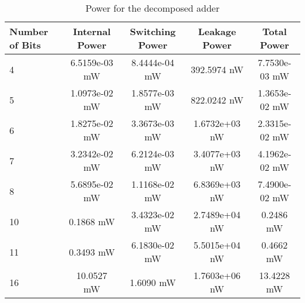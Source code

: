 \documentclass[a4paper]{article}
\begin{document}
\begin{table}
   \centering
        \caption{Power for the decomposed adder}
				\vspace{6pt}
        \begin{tabular}{l  c  c  c  c}
\toprule 
           Number of Bits & Internal Power & Switching Power & Leakage Power & Total Power\\
\midrule               
                4  & 6.5159e-03 mW & 8.4444e-04 mW & 392.5974 nW & 7.7530e-03 mW\\
                5  & 1.0973e-02 mW & 1.8577e-03 mW & 822.0242 nW & 1.3653e-02 mW \\
                6  & 1.8275e-02 mW & 3.3673e-03 mW & 1.6732e+03 nW & 2.3315e-02 mW \\
                7  & 3.2342e-02 mW & 6.2124e-03 mW & 3.4077e+03 nW & 4.1962e-02 mW \\
                8  & 5.6895e-02 mW & 1.1168e-02 mW & 6.8369e+03 nW & 7.4900e-02 mW \\
                10 & 0.1868 mW  & 3.4323e-02 mW & 2.7489e+04 nW  &  0.2486 mW \\
                11 & 0.3493 mW  & 6.1830e-02 mW & 5.5015e+04 nW  &  0.4662 mW \\
                16 & 10.0527 mW & 1.6090 mW     & 1.7603e+06 nW  & 13.4228 mW\\
 \bottomrule              
        \end{tabular}
        \label{tab:asic_power}
\end{table}

\end{document}
